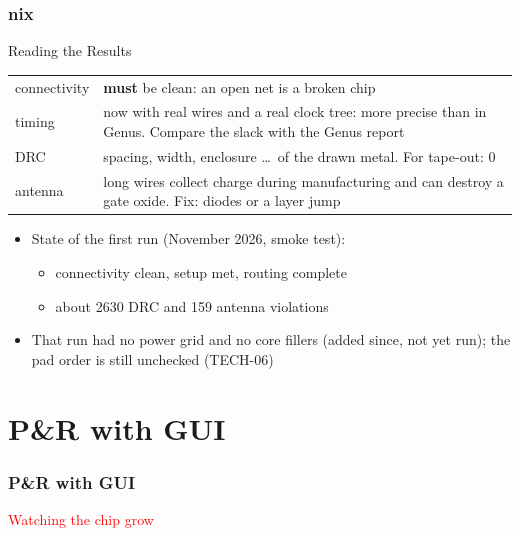 \documentclass{beamer}
\newcommand{\astitle}{nix}
\newcommand{\assubtitle}{nix}
\begin{document}
\renewcommand{\assubtitle}{Reading the Results}
\begin{frame}
\frametitle{\astitle}
\begin{block}{\assubtitle}
  \footnotesize
  \begin{tabularx}{\linewidth}{@{}lY@{}}
    connectivity & \textbf{must} be clean: an open net is a broken chip\\[2pt]
    timing       & now with real wires and a real clock tree: more precise
                   than in Genus. Compare the slack with the Genus report\\[2pt]
    DRC          & spacing, width, enclosure \dots\ of the drawn metal.
                   For tape-out: 0\\[2pt]
    antenna      & long wires collect charge during manufacturing and
                   can destroy a gate oxide. Fix: diodes or a layer jump\\
  \end{tabularx}
  \vspace{4pt}
  \begin{itemize}
    \item State of the first run (November 2026, smoke test):
    \begin{itemize}
      \item connectivity clean, setup met, routing complete
      \item about 2630 DRC and 159 antenna violations
    \end{itemize}
    \item That run had no power grid and no core fillers (added since,
      not yet run); the pad order is still unchecked (TECH-06)
  \end{itemize}
\end{block}
\end{frame}

\section{P\&R with GUI}
\renewcommand{\astitle}{P\&R with GUI}
\begin{frame}
\frametitle{\astitle}
\textcolor{red}{Watching the chip grow}
\end{frame}
\end{document}
